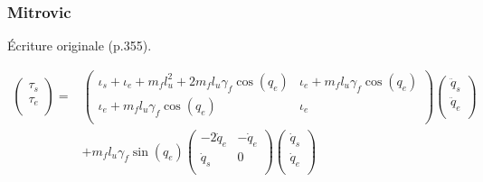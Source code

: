\documentclass[pdftex,a4paper,11pt]{article}
\numberwithin{equation}{subsection}
\begin{document}

\subsubsection{Mitrovic}
Écriture originale \cite{katayama1993} (p.355).

\begin{align*}
    \begin{pmatrix}
        \tau_s \\
        \tau_e \\
    \end{pmatrix} =
    & \begin{pmatrix}
        \iota_s + \iota_e + m_f l_u^2 + 2 m_f l_u \gamma_f \cos(q_e)  &  \iota_e + m_f l_u \gamma_f \cos(q_e) \\
        \iota_e + m_f l_u \gamma_f \cos(q_e)  &  \iota_e\\
    \end{pmatrix}
    \begin{pmatrix}
        \ddot{q}_s \\
        \ddot{q}_e \\
    \end{pmatrix}\\
    & + m_f l_u \gamma_f \sin(q_e)
    \begin{pmatrix}
        -2 \dot{q}_e  &  -\dot{q}_e \\
        \dot{q}_s     &  0\\
    \end{pmatrix}
    \begin{pmatrix}
        \dot{q}_s \\
        \dot{q}_e \\
    \end{pmatrix}
\end{align*}
\end{document}
